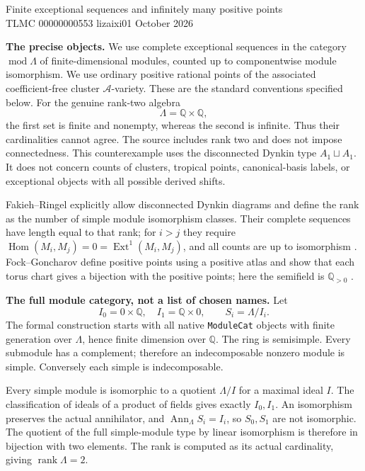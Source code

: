 \documentclass[10pt,a4paper]{article}
\begin{document}
\begin{center}
{\Large Finite exceptional sequences and infinitely many positive points}\\[4pt]
TLMC 00000000553 \quad lizaixi01  October 2026
\end{center}

\textbf{The precise objects.}
We use complete exceptional sequences in the category $\operatorname{mod}\Lambda$
of finite-dimensional modules, counted up to componentwise module isomorphism.
We use ordinary positive rational points of the associated coefficient-free
cluster $\mathcal A$-variety. These are the standard conventions specified below.
For the genuine rank-two algebra
\[
 \Lambda=\mathbb Q\times\mathbb Q,
\]
the first set is finite and nonempty, whereas the second is infinite.
Thus their cardinalities cannot agree. The source includes rank two and
does not impose connectedness. This counterexample uses the disconnected
Dynkin type $A_1\sqcup A_1$.
It does not concern counts of clusters, tropical points, canonical-basis
labels, or exceptional objects with all possible derived shifts.

Fakieh--Ringel explicitly allow disconnected Dynkin diagrams and define
the rank as the number of simple module isomorphism classes.
Their complete sequences have length equal to that rank; for $i>j$ they
require $\operatorname{Hom}(M_i,M_j)=0=\operatorname{Ext}^1(M_i,M_j)$,
and all counts are up to isomorphism \cite{fr}.
Fock--Goncharov define positive points using a positive atlas and show that
each torus chart gives a bijection with the positive points; here the
semifield is $\mathbb Q_{>0}$ \cite{fg}.

\textbf{The full module category, not a list of chosen names.}
Let
\[
 I_0=0\times\mathbb Q,\quad I_1=\mathbb Q\times0,
 \qquad S_i=\Lambda/I_i.
\]
The formal construction starts with all native \texttt{ModuleCat} objects
with finite generation over $\Lambda$, hence finite dimension over $\mathbb Q$.
The ring is semisimple. Every submodule has a complement; therefore an
indecomposable nonzero module is simple. Conversely each simple is
indecomposable.

Every simple module is isomorphic to a quotient $\Lambda/I$ for a
maximal ideal $I$. The classification of ideals of a product of fields
gives exactly $I_0,I_1$. An isomorphism preserves the actual annihilator,
and $\operatorname{Ann}_\Lambda S_i=I_i$, so $S_0,S_1$ are not isomorphic.
The quotient of the full simple-module type by linear isomorphism is
therefore in bijection with two elements. The rank is computed as its
actual cardinality, giving $\operatorname{rank}\Lambda=2$.
\end{document}
